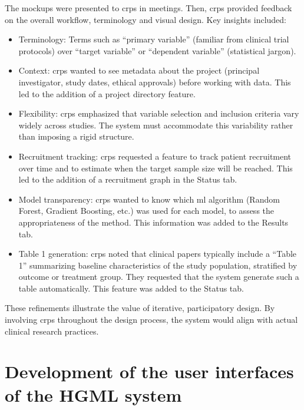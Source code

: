 \documentclass[twoside,final]{Contexto}
\begin{document}
The mockups were presented to \glspl{crp} in meetings. Then, \glspl{crp} provided feedback on the overall workflow, terminology and visual design. Key insights included:

\begin{itemize}
    \item Terminology: Terms such as ``primary variable'' (familiar from clinical trial protocols) over ``target variable'' or ``dependent variable'' (statistical jargon).
    \item Context: \glspl{crp} wanted to see metadata about the project (principal investigator, study dates, ethical approvals) before working with data. This led to the addition of a project directory feature.

    \item Flexibility: \glspl{crp} emphasized that variable selection and inclusion criteria vary widely across studies. The system must accommodate this variability rather than imposing a rigid structure.
    
    \item Recruitment tracking: \glspl{crp} requested a feature to track patient recruitment over time and to estimate when the target sample size will be reached. This led to the addition of a recruitment graph in the Status tab.
    
    \item Model transparency: \glspl{crp} wanted to know which \gls{ml} algorithm (Random Forest, Gradient Boosting, etc.) was used for each model, to assess the appropriateness of the method. This information was added to the Results tab.
    
    \item Table 1 generation: \glspl{crp} noted that clinical papers typically include a ``Table 1'' summarizing baseline characteristics of the study population, stratified by outcome or treatment group. They requested that the system generate such a table automatically. This feature was added to the Status tab.
\end{itemize}    

These refinements illustrate the value of iterative, participatory design. By involving \glspl{crp} throughout the design process, the system would align with actual clinical research practices.


\section{Development of the user interfaces of the HGML system}
\end{document}
